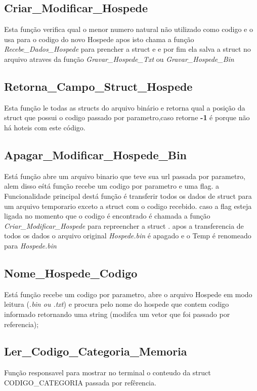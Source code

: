 \documentclass{article}
\begin{document}
\subsection{Criar\_Modificar\_Hospede}
	Esta função verifica qual o menor numero natural não utilizado como codigo e o usa para o codigo do novo Hospede apos isto  chama a função \textit{Recebe\_Dados\_Hospede} para prencher a struct e e por fim ela salva a struct no arquivo atraves da função \textit{Gravar\_Hospede\_Txt} ou \textit{Gravar\_Hospede\_Bin}

\subsection{Retorna\_Campo\_Struct\_Hospede}
	Esta função le todas as structs do arquivo binário e retorna qual a posição da struct que possui o codigo passado por parametro,caso retorne \textbf{-1} é porque não há hoteis com este código.

\subsection{Apagar\_Modificar\_Hospede\_Bin}
	Está função abre um arquivo binario que teve sua  url passada por parametro, alem disso eśtá função recebe um codigo por parametro e uma flag.
	a Funcionalidade principal destá função é transferir todos os dados de struct para um arquivo temporario exceto a struct com o codigo recebido. caso a flag esteja ligada no momento que o codigo é encontrado é chamada a função \textit{Criar\_Modificar\_Hospede} para repreencher a struct . apos a transferencia de todos os dados o arquivo original \textit{Hospede.bin} é apagado e o Temp é renomeado para \textit{Hospede.bin}

\subsection{Nome\_Hospede\_Codigo}
	Está função recebe um codigo por parametro, abre o arquivo Hospede em modo leitura (\textit{.bin ou .txt}) e procura pelo nome do hospede que contem  codigo informado retornando uma string (modifca um vetor que foi passado por referencia);


\subsection{Ler\_Codigo\_Categoria\_Memoria}
	Função responsavel para mostrar no terminal o conteudo da struct CODIGO\_CATEGORIA passada por  refêrencia.
\end{document}
